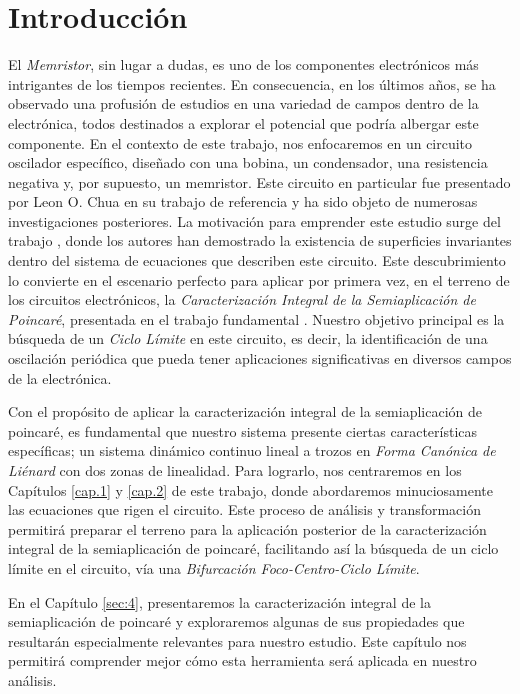 \documentclass[12pt,a4paper]{report} %
\begin{document}
	\chapter*{Introducción}
	\thispagestyle{plain}

	El \textit{Memristor}, sin lugar a dudas, es uno de los componentes electrónicos más intrigantes de los tiempos recientes. En consecuencia, en los últimos años, se ha observado una profusión de estudios en una variedad de campos dentro de la electrónica, todos destinados a explorar el potencial que podría albergar este componente. En el contexto de este trabajo, nos enfocaremos en un circuito oscilador específico, diseñado con una bobina, un condensador, una resistencia negativa y, por supuesto, un memristor. Este circuito en particular fue presentado por Leon O. Chua en su trabajo de referencia \cite{chuaoscillator2008} y ha sido objeto de numerosas investigaciones posteriores. La motivación para emprender este estudio surge del trabajo \cite{ponce}, donde los autores han demostrado la existencia de superficies invariantes dentro del sistema de ecuaciones que describen este circuito. Este descubrimiento lo convierte en el escenario perfecto para aplicar por primera vez, en el terreno de los circuitos electrónicos, la \textit{Caracterización Integral de la Semiaplicación de Poincaré}, presentada en el trabajo fundamental \cite{caracterizacion}. Nuestro objetivo principal es la búsqueda de un \textit{Ciclo Límite} en este circuito, es decir, la identificación de una oscilación periódica que pueda tener aplicaciones significativas en diversos campos de la electrónica.
	
	\vspace{0.5cm} Con el propósito de aplicar la caracterización integral de la semiaplicación de poincaré, es fundamental que nuestro sistema presente ciertas características específicas; un sistema dinámico continuo lineal a trozos en \textit{Forma Canónica de Liénard} con dos zonas de linealidad. Para lograrlo, nos centraremos en los Capítulos \ref{cap.1} y \ref{cap.2} de este trabajo, donde abordaremos minuciosamente las ecuaciones que rigen el circuito. Este proceso de análisis y transformación permitirá preparar el terreno para la aplicación posterior de la caracterización integral de la semiaplicación de poincaré, facilitando así la búsqueda de un ciclo límite en el circuito, vía una \textit{Bifurcación Foco-Centro-Ciclo Límite}.
	
	\vspace{0.5cm} En el Capítulo \ref{sec:4}, presentaremos la caracterización integral de la semiaplicación de poincaré y exploraremos algunas de sus propiedades que resultarán especialmente relevantes para nuestro estudio. Este capítulo nos permitirá comprender mejor cómo esta herramienta será aplicada en nuestro análisis.
	
\end{document}
